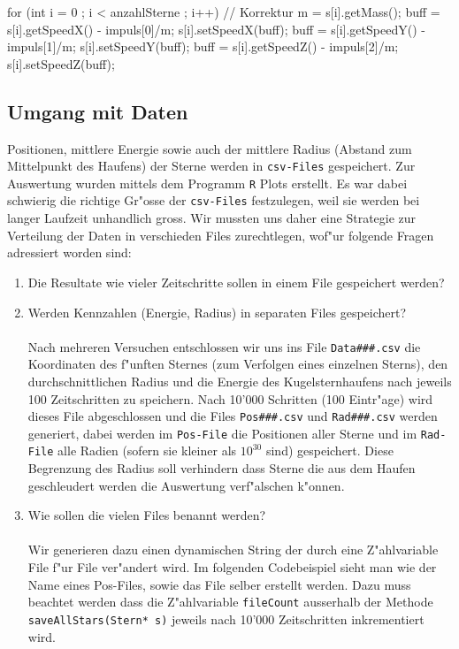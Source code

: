 \begin{refsection}
\begin{Cpp}
for (int i = 0 ; i < anzahlSterne ; i++){	// Korrektur 
	m = s[i].getMass();
	buff = s[i].getSpeedX() - impuls[0]/m;
	s[i].setSpeedX(buff);
	buff = s[i].getSpeedY() - impuls[1]/m;
	s[i].setSpeedY(buff);
	buff = s[i].getSpeedZ() - impuls[2]/m;
	s[i].setSpeedZ(buff);
}
\end{Cpp}	
	
	\subsection{Umgang mit Daten}
	Positionen, mittlere Energie sowie auch der mittlere Radius (Abstand zum Mittelpunkt des Haufens) der Sterne werden in \texttt{csv-Files} gespeichert. Zur Auswertung wurden mittels dem Programm \texttt{R} Plots erstellt. Es war dabei schwierig die richtige Gr"osse der \texttt{csv-Files} festzulegen, weil sie werden bei langer Laufzeit unhandlich gross. Wir mussten uns daher eine Strategie zur Verteilung der Daten in verschieden Files zurechtlegen, wof"ur folgende Fragen adressiert worden sind:
	\begin{enumerate}
	\item Die Resultate wie vieler Zeitschritte sollen in einem File gespeichert werden? 
	\item Werden Kennzahlen (Energie, Radius) in separaten Files gespeichert? \\ \\
	Nach mehreren Versuchen entschlossen wir uns ins File \texttt{Data\#\#\#.csv} die Koordinaten des f"unften Sternes (zum Verfolgen eines einzelnen Sterns), den durchschnittlichen Radius und die Energie des Kugelsternhaufens nach jeweils 100 Zeitschritten zu speichern. Nach 10'000 Schritten (100 Eintr"age) wird dieses File abgeschlossen und die Files \texttt{Pos\#\#\#.csv} und \texttt{Rad\#\#\#.csv} werden generiert, dabei werden im \texttt{Pos-File} die Positionen aller Sterne und im \texttt{Rad-File} alle Radien (sofern sie kleiner als $\mathrm{10^{30}}$ sind) gespeichert. Diese Begrenzung des Radius soll verhindern dass Sterne die aus dem Haufen geschleudert werden die Auswertung verf"alschen k"onnen.
	\item Wie sollen die vielen Files benannt werden? \\ \\
	Wir generieren dazu einen dynamischen String der durch eine Z"ahlvariable File f"ur File ver"andert wird. Im folgenden Codebeispiel sieht man wie der Name eines Pos-Files, sowie das File selber erstellt werden. Dazu muss beachtet werden dass die Z"ahlvariable \texttt{fileCount} ausserhalb der Methode \texttt{saveAllStars(Stern* s)} jeweils nach 10'000 Zeitschritten inkrementiert wird.

\end{enumerate}
\end{refsection}
